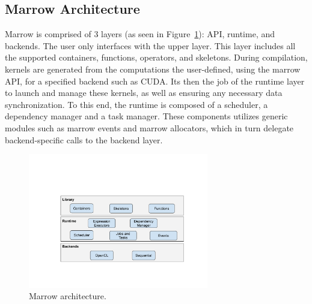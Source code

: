\subsection{Marrow Architecture}

Marrow is comprised of 3 layers (as seen in Figure~\ref{fig:marro_architecture}): API, runtime, and backends. The user only interfaces with the upper layer. This layer includes all the supported containers, functions, operators, and skeletons. During compilation, kernels are generated from the computations the user-defined, using the marrow API, for a specified backend such as \gls{CUDA}. Its then the job of the runtime layer to launch and manage these kernels, as well as ensuring any necessary data synchronization. To this end, the runtime 
is composed of a scheduler, a dependency manager and a task manager. These components utilizes generic modules such as marrow events and marrow allocators, which in turn delegate backend-specific calls to the backend layer.

\begin{figure}[tbp]
  \centering
    \includegraphics[width=0.7\textwidth]{Chapters/Figures/Images/marrow_architecture.pdf}
    \caption{Marrow architecture.}
\label{fig:marro_architecture}
\end{figure}



